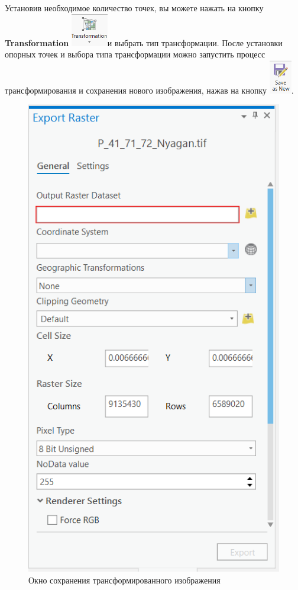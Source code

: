 \documentclass[
  12pt,
]{book}
\begin{document}
Установив необходимое количество точек, вы можете нажать на кнопку \textbf{Transformation} \includegraphics{images/Ref02/Arc_transformation.png}и выбрать тип трансформации. После установки опорных точек и выбора типа трансформации можно запустить процесс трансформирования и сохранения нового изображения, нажав на кнопку \includegraphics{images/Ref02/Arc_save_as_new.png}.

\begin{figure}
\centering
\includegraphics{images/Ref02/Arc_export_raster.png}
\caption{Окно сохранения трансформированного изображения}
\end{figure}
\end{document}
